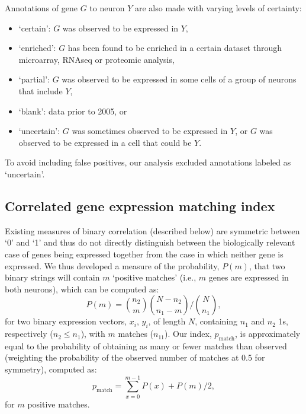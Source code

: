 \documentclass[10pt,letterpaper]{article}
\begin{document}
{Annotations of gene $G$ to neuron $Y$ are also made with varying levels of certainty:
\begin{itemize}
    \item `certain': $G$ was observed to be expressed in $Y$,
    \item `enriched': $G$ has been found to be enriched in a certain dataset through microarray, RNAseq or proteomic analysis,
    \item `partial': $G$ was observed to be expressed in some cells of a group of neurons that include $Y$,
    \item `blank': data prior to 2005, or
    \item `uncertain': $G$ was sometimes observed to be expressed in $Y$, or $G$ was observed to be expressed in a cell that could be $Y$.
\end{itemize}
To avoid including false positives, our analysis excluded annotations labeled as `uncertain'.


\subsection*{Correlated gene expression matching index}
Existing measures of binary correlation (described below) are symmetric between `0' and `1' and thus do not directly distinguish between the biologically relevant case of genes being expressed together from the case in which neither gene is expressed.
We thus developed a measure of the probability, $P(m)$, that two binary strings will contain $m$ `positive matches' (i.e., $m$ genes are expressed in both neurons), which can be computed as:
\begin{equation} \label{eqn:positiveMatch}
    P(m) = \binom{n_2}{m} \binom{N-n_2}{n_1-m} / \binom{N}{n_1},
\end{equation}
for two binary expression vectors, $x_i$, $y_i$, of length $N$, containing $n_1$ and $n_2$ 1s, respectively ($n_2 \leq n_1$), with $m$ matches ($n_{11}$).
Our index, $p_\mathrm{match}$, is approximately equal to the probability of obtaining as many or fewer matches than observed (weighting the probability of the observed number of matches at 0.5 for symmetry), computed as:
\begin{equation} \label{eqn:pmatch}
     p_\mathrm{match} = \sum_{x=0}^{m-1} P(x) + P(m)/2,
\end{equation}
for $m$ positive matches.

}
\end{document}
